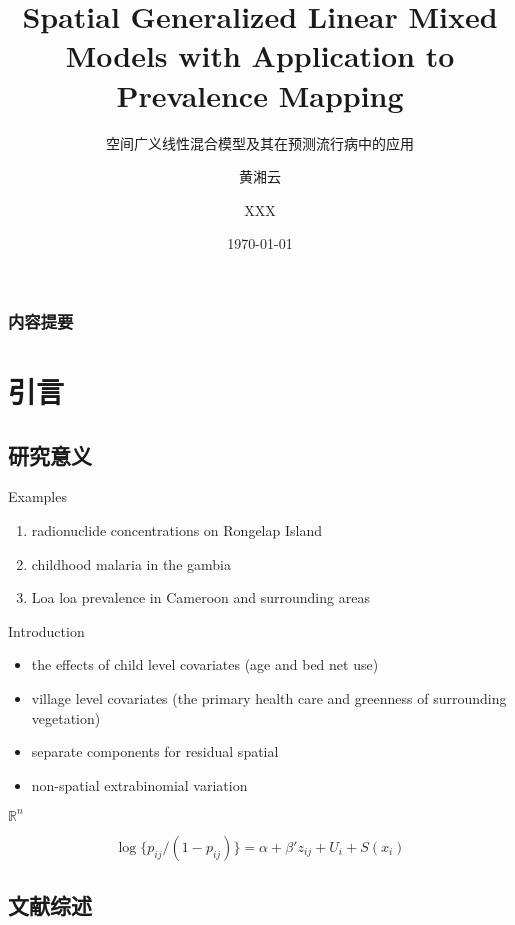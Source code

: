 \documentclass[11pt,compress,xcolor=x11names,UTF8]{beamer}
\title{Spatial Generalized Linear Mixed Models with Application to Prevalence Mapping}
\subtitle{空间广义线性混合模型及其在预测流行病中的应用}
\author{黄湘云 \and XXX}
\institute{\texttt{[image: logo]} \\~~ \\ 理学院 \\ 中国矿业大学（北京）}
\date{\today}
\begin{document}
\maketitle

\begin{frame}
  \frametitle{内容提要}
  \tableofcontents  
\end{frame}


\section{引言}


\subsection{研究意义}

\begin{frame}{Examples}

\begin{enumerate}
\item radionuclide concentrations on Rongelap Island
\item childhood malaria in the gambia
\item Loa loa prevalence in Cameroon and surrounding areas
\end{enumerate}

\end{frame}

\begin{frame}{Introduction}
\citet{Diggle2002}
\begin{itemize}
\item the effects of child level covariates (age and bed net use)
\item village level covariates (the primary health care and greenness of surrounding vegetation)
\item separate components for residual spatial
\item non-spatial extrabinomial variation
\end{itemize}

$\mathbb{R}^{n}$

$$\log \{p_{ij}/(1-p_{ij})\} =\alpha + \beta'z_{ij} + U_{i} + S(x_{i})$$

\end{frame}

\subsection{文献综述}
\end{document}
